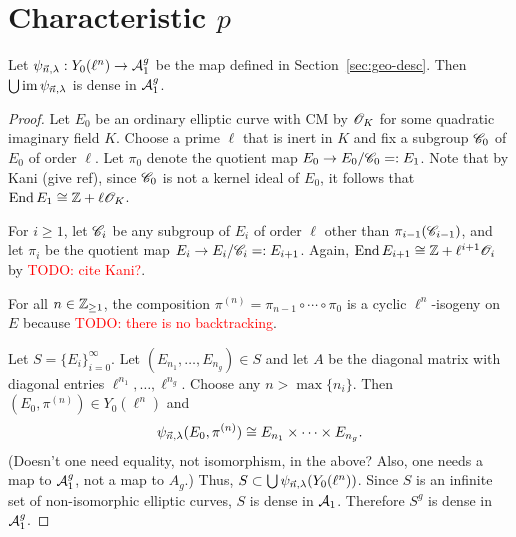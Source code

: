 \documentclass{amsart}
\begin{document}
\section{Characteristic $p$}
\label{sec:characteristic-p}

\begin{theorem}
 Let $\psi_{\vec{n},\lambda}: Y_0(\ell^n) \to \mathcal{A}_1^g$ be the map defined in Section~\ref{sec:geo-desc}. Then $\bigcup\operatorname{im}\psi_{\vec{n},\lambda}$ is dense in $\mathcal{A}_1^g$.
\end{theorem}
\begin{proof}
 Let $E_0$ be an ordinary elliptic curve with CM by $\mathscr{O}_K$ for some quadratic imaginary field $K$. Choose a prime $\ell$ that is inert in $K$ and fix a subgroup $\mathscr{C}_0$ of $E_0$ of order $\ell$. Let $\pi_0$ denote the quotient map $E_0 \to E_0/\mathscr{C}_0 =: E_1$. Note that by Kani (give ref), since $\mathscr{C}_0$ is not a kernel ideal of $E_0$, it follows that $\operatorname{End} E_1 \cong \mathbb{Z} + \ell\mathscr{O}_K$.

 For $i \ge 1$, let $\mathscr{C}_i$ be any subgroup of $E_i$ of order $\ell$ other than $\pi_{i-1}(\mathscr{C}_{i-1})$, and let $\pi_i$ be the quotient map $E_i \to E_i/\mathscr{C}_i =: E_{i+1}$. Again, $\operatorname{End} E_{i+1} \cong \mathbb{Z} + \ell^{i+1}\mathscr{O}_{i}$ by \textcolor{red}{TODO: cite Kani?}.

 For all $n \in \mathbb{Z}_{\ge 1}$, the composition $\pi^{(n)} = \pi_{n-1} \circ \cdots \circ \pi_0$ is a cyclic $\ell^n$-isogeny on $E$ because \textcolor{red}{TODO: there is no backtracking}.

 Let $S = \{E_i\}_{i=0}^\infty$. Let $(E_{n_1},\dots,E_{n_g}) \in S$ and let $A$ be the diagonal matrix with diagonal entries $\ell^{n_1},\dots,\ell^{n_g}$.  Choose any $n > \max\{n_i\}$. Then $(E_0,\pi^{(n)}) \in Y_0(\ell^n)$ and
 \[
   \psi_{\vec{n},\lambda}(E_0,\pi^{(n)}) \cong E_{n_1} \times \cdots \times E_{n_g}.
 \]
(Doesn't one need equality, not isomorphism, in the above? Also, one needs a map to $\mathcal{A}_1^g$, not a map to $A_g$.)  Thus, $S \subset \bigcup\psi_{\vec{n},\lambda}(Y_0(\ell^n))$. Since $S$ is an infinite set of non-isomorphic elliptic curves, $S$ is dense in $\mathcal{A}_1$. Therefore $S^g$ is dense in $\mathcal{A}_1^g$.
\end{proof}



\end{document}
